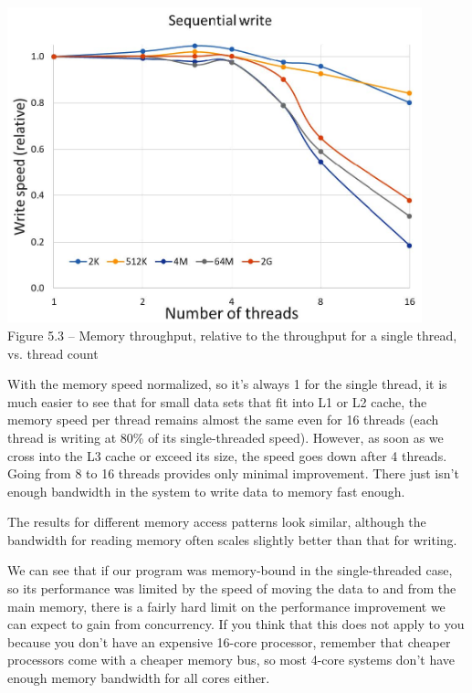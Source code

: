 \hspace*{\fill} \\ %
\begin{center}
\includegraphics[width=0.9\textwidth]{content/1/chapter5/images/3.jpg}\\
Figure 5.3 – Memory throughput, relative to the throughput for a single thread, vs. thread count
\end{center}

With the memory speed normalized, so it's always 1 for the single thread, it is much easier to see that for small data sets that fit into L1 or L2 cache, the memory speed per thread remains almost the same even for 16 threads (each thread is writing at 80\% of its single-threaded speed). However, as soon as we cross into the L3 cache or exceed its size, the speed goes down after 4 threads. Going from 8 to 16 threads provides only minimal improvement. There just isn't enough bandwidth in the system to write data to memory fast enough. 

The results for different memory access patterns look similar, although the bandwidth for reading memory often scales slightly better than that for writing.

We can see that if our program was memory-bound in the single-threaded case, so its performance was limited by the speed of moving the data to and from the main memory, there is a fairly hard limit on the performance improvement we can expect to gain from concurrency. If you think that this does not apply to you because you don't have an expensive 16-core processor, remember that cheaper processors come with a cheaper memory bus, so most 4-core systems don't have enough memory bandwidth for all cores either.

